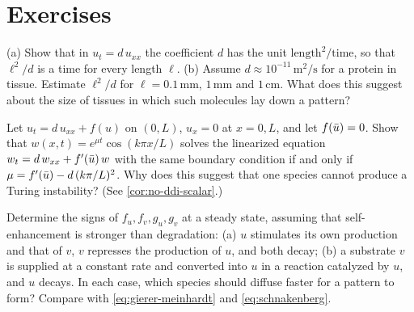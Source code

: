 \section{Exercises}\label{sec:intro-exercises}

\begin{exercise}\label{exer:intro-units}
(a) Show that in $u_t=d\,u_{xx}$ the coefficient $d$ has the unit
$\text{length}^2/\text{time}$, so that $\ell^2/d$ is a time for every length $\ell$.
(b) Assume $d\approx10^{-11}\,\mathrm{m^2/s}$ for a protein in tissue. Estimate
$\ell^2/d$ for $\ell=0.1\,\mathrm{mm}$, $1\,\mathrm{mm}$ and $1\,\mathrm{cm}$. What
does this suggest about the size of tissues in which such molecules lay down a
pattern?
\end{exercise}

\begin{exercise}\label{exer:intro-one-species}
Let $u_t=d\,u_{xx}+f(u)$ on $(0,L)$, $u_x=0$ at $x=0,L$, and let $f(\bar u)=0$.
Show that $w(x,t)=e^{\mu t}\cos(k\pi x/L)$ solves the linearized
equation $w_t=d\,w_{xx}+f'(\bar u)\,w$ with the same boundary condition if and only if
$\mu=f'(\bar u)-d\,(k\pi/L)^2$. Why does this suggest that one species cannot produce a
Turing instability? (See \cref{cor:no-ddi-scalar}.)
\end{exercise}

\begin{exercise}\label{exer:intro-signs}
Determine the signs of $f_u,f_v,g_u,g_v$ at a steady state, assuming that
self-enhancement is stronger than degradation:
(a) $u$ stimulates its own production and that of $v$, $v$ represses the production
of $u$, and both decay; (b) a substrate $v$ is supplied at a constant rate and
converted into $u$ in a reaction catalyzed by $u$, and $u$ decays.
In each case, which species should diffuse faster for a pattern to form? Compare
with \eqref{eq:gierer-meinhardt} and \eqref{eq:schnakenberg}.
\end{exercise}
